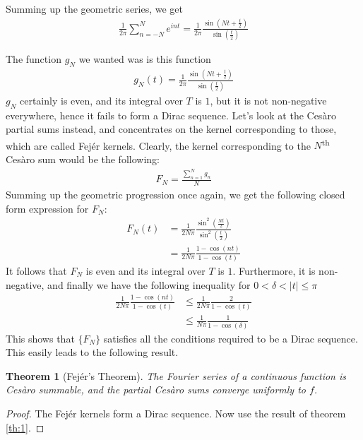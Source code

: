 \documentclass[12pt, titlepage]{article}
\newtheorem{thm}{Theorem}[section]
\theoremstyle{definition}
\begin{document}
Summing up the geometric series, we get
\begin{align*}
    \frac{1}{2\pi} \sum_{n = -N}^{N} e^{int} = \frac{1}{2\pi} \frac{\sin\left( Nt + \frac{t}{2} \right)}{\sin\left( \frac{t}{2} \right)}
\end{align*}

The function $g_N$ we wanted was is this function
\begin{align*}
    g_N(t) = \frac{1}{2\pi} \frac{\sin\left( Nt + \frac{t}{2} \right)}{\sin\left( \frac{t}{2} \right)}
\end{align*}
$g_N$ certainly is even, and its integral over $T$ is $1$, but it is not non-negative everywhere, hence it fails to form a Dirac sequence. Let's look at the Cesàro partial sums instead, and concentrates on the kernel corresponding to those, which are called Fejér kernels. Clearly, the kernel corresponding to the $N$\textsuperscript{th} Cesàro sum would be the following:
\begin{align*}
    F_N = \frac{\sum_{n=1}^{N} g_n}{N} 
\end{align*}
Summing up the geometric progression once again, we get the following closed form expression for $F_N$:
\begin{align*}
    F_N(t) &= \frac{1}{2N\pi} \frac{\sin^2 \left( \frac{Nt}{2} \right)}{\sin^2 \left( \frac{t}{2} \right)} \\
    & = \frac{1}{2N\pi} \frac{1 - \cos(nt)}{1 - \cos(t)}
\end{align*}
It follows that $F_N$ is even and its integral over $T$ is $1$. Furthermore, it is non-negative, and finally we have the following inequality for $0 < \delta < |t| \leq \pi$
\begin{align*}
    \frac{1}{2N\pi} \frac{1 - \cos(nt)}{1 - \cos(t)} &\leq \frac{1}{2N\pi} \frac{2}{1 - \cos(t)} \\
    &\leq \frac{1}{N\pi} \frac{1}{1 - \cos(\delta)}
\end{align*}
This shows that $\{F_N\}$ satisfies all the conditions required to be a Dirac sequence. This easily leads to the following result.

\begin{thm}[Fejér's Theorem] \label{th:2}
    The Fourier series of a continuous function is Cesàro summable, and the partial Cesàro sums converge uniformly to $f$.
\end{thm}

\begin{proof}
    The Fejér kernels form a Dirac sequence. Now use the result of theorem \ref{th:1}.
\end{proof}
\end{document}
